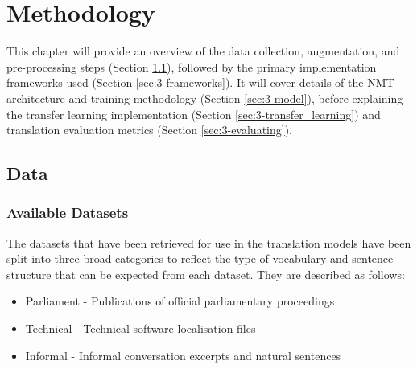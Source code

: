 \chapter{Methodology}

This chapter will provide an overview of the data collection, augmentation, and pre-processing steps (Section \ref{sec:3-data}), followed by the primary implementation frameworks used (Section \ref{sec:3-frameworks}). It will cover details of the \acrshort{NMT} architecture and training methodology (Section \ref{sec:3-model}), before explaining the transfer learning implementation (Section \ref{sec:3-transfer_learning}) and translation evaluation metrics (Section \ref{sec:3-evaluating}).



\newpage

\section{Data}
\label{sec:3-data}
\subsection{Available Datasets}


The datasets that have been retrieved for use in the translation models have been split into three broad categories to reflect the type of vocabulary and sentence structure that can be expected from each dataset. They are described as follows:

\begin{itemize}
    \item Parliament - Publications of official parliamentary proceedings
    \item Technical - Technical software localisation files
    \item Informal - Informal conversation excerpts and natural sentences
\end{itemize}


